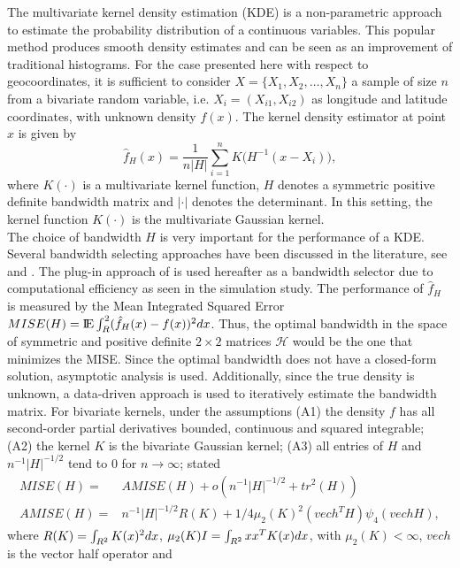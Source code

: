 The multivariate kernel density estimation (KDE) is a non-parametric approach to estimate the probability distribution of a continuous variables.
This popular method produces smooth density estimates and can be seen as an improvement of  traditional histograms. 
For the case presented here with respect to geocoordinates, it is sufficient to consider $X = \{X_1,X_2, \dots,X_n\}$ a sample of size $n$ from a bivariate random variable, i.e. $X_i = (X_{i1}, X_{i2})$ as longitude and latitude coordinates, with unknown density $f(x)$. 
The kernel density estimator at point $x$ is given by
\begin{equation}\label{eq:kde}
  \hat{f}_H(x) =  \frac{1}{n|H|} \sum_{i = 1}^n K\Big(H^{-1}(x-X_i)\Big),
\end{equation}
where $K(\cdot)$ is a multivariate kernel function, $H$ denotes a symmetric positive definite bandwidth matrix and $|\cdot|$ denotes the determinant. 
In this setting, the kernel function $K(\cdot)$ is the multivariate Gaussian kernel.\\ 
The choice of bandwidth $H$ is very important for the
performance of a KDE. 
Several bandwidth selecting approaches have been discussed in the literature, see \cite{Izenman} and \cite{Silverman}. 
The plug-in approach of \cite{Wand94} is used hereafter as a bandwidth selector due to computational efficiency as seen in the simulation study. 
The performance of $\hat{f}_H$ is measured by the Mean Integrated Squared Error 
$ MISE(H) = \E \int_R^2 (\hat{f}_H(x) - f(x))^2 dx $. Thus, the optimal bandwidth in the space of symmetric and positive definite $2 \times 2$ matrices $\mathcal{H}$ would be the one that minimizes the MISE. 
Since the optimal bandwidth does not have a closed-form solution, asymptotic analysis is used. Additionally, since the true density is unknown, a data-driven approach is used to iteratively estimate the bandwidth matrix. For bivariate kernels, under the assumptions
(A1) the density $f$ has all second-order partial derivatives
bounded, continuous and squared integrable;
(A2) the kernel $K$ is the bivariate Gaussian kernel;
(A3) all entries of $H$ and $n^{-1} |H|^{-1/2}$ tend to 0 for $n \to \infty$; 
\cite{Duong2003} stated 
\begin{align*}
    MISE(H) = & AMISE(H) + o(n^{-1} |H|^{-1/2} + tr^2(H)) \\
    AMISE(H) = & n^{-1} |H|^{-1/2} R(K) + 1/4 \mu_2(K)^2(vech^TH) \psi_4 (vech H),
\end{align*}
where $R(K) = \int_{R^2} K(x)^2 d x$, 
$\mu_2(K)I = \int_{R^2} xx^T K(x) d x$, with $\mu_2(K) < \infty$, $vech$ is the vector half operator and 
